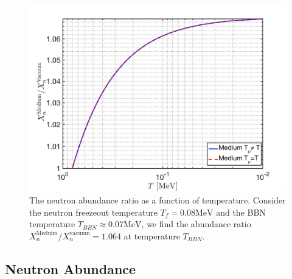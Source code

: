 \begin{figure}[h]
\begin{center}
\includegraphics[width=\linewidth]{./plots/Neutron_Abundance}
\caption{The neutron abundance ratio as a function of temperature. Consider the neutron freezeout temperature $T_f=0.08\mathrm{MeV}$ and the BBN temperature $T_{BBN}\approx0.07\mathrm{MeV}$, we find the abundance ratio ${X_n^{\mathrm{Meduim}}}/{X_n^{\mathrm{vacuum}}}=1.064$ at temperature $T_{BBN}$.}%
\label{Neutron_Abundance}
\end{center}
\end{figure}
\subsection{Neutron Abundance}\label{Neutron}

